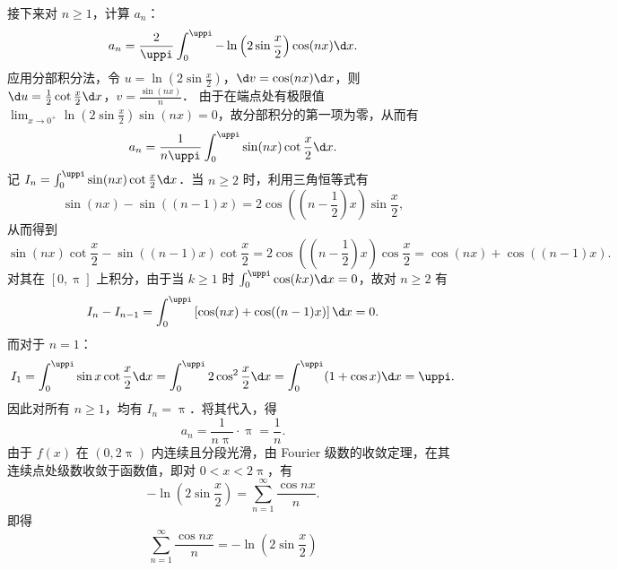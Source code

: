 \begin{myproof}
    接下来对 $n \geqslant 1$，计算 $a_n$：
    \begin{equation}\label{eq:an-integral}
        a_n = \frac{2}{\uppi} \int_{0}^{\uppi} -\ln \left( 2\sin \frac{x}{2} \right) \cos(nx) \d x.
    \end{equation}
    应用分部积分法，令 $u = \ln \left( 2\sin \frac{x}{2} \right)$，$\d v = \cos(nx) \d x$，则 $\d u = \frac{1}{2} \cot \frac{x}{2} \d x$，$v = \frac{\sin(nx)}{n}$．
    由于在端点处有极限值 $\lim_{x \to 0^+} \ln \left( 2\sin \frac{x}{2} \right) \sin(nx) = 0$，故分部积分的第一项为零，从而有
    \begin{equation}\label{eq:an-parts}
        a_n = \frac{1}{n\uppi} \int_{0}^{\uppi} \sin(nx) \cot \frac{x}{2} \d x.
    \end{equation}
    记 $I_n = \int_{0}^{\uppi} \sin(nx) \cot \frac{x}{2} \d x$．当 $n \geqslant 2$ 时，利用三角恒等式有
    \begin{equation}\label{eq:trig-identity}
        \sin(nx) - \sin((n-1)x) = 2 \cos\left( \left(n - \frac{1}{2}\right)x \right) \sin \frac{x}{2},
    \end{equation}
    从而得到
    \begin{equation}\label{eq:diff-identity}
        \sin(nx) \cot \frac{x}{2} - \sin((n-1)x) \cot \frac{x}{2} = 2 \cos\left( \left(n - \frac{1}{2}\right)x \right) \cos \frac{x}{2} = \cos(nx) + \cos((n-1)x).
    \end{equation}
    对其在 $[0, \uppi]$ 上积分，由于当 $k \geqslant 1$ 时 $\int_{0}^{\uppi} \cos(kx) \d x = 0$，故对 $n \geqslant 2$ 有
    \begin{equation}\label{eq:in-diff}
        I_n - I_{n-1} = \int_{0}^{\uppi} \left[ \cos(nx) + \cos((n-1)x) \right] \d x = 0.
    \end{equation}
    而对于 $n=1$：
    \begin{equation}\label{eq:i1-calc}
        I_1 = \int_{0}^{\uppi} \sin x \cot \frac{x}{2} \d x = \int_{0}^{\uppi} 2 \cos^2 \frac{x}{2} \d x = \int_{0}^{\uppi} (1 + \cos x) \d x = \uppi.
    \end{equation}
    因此对所有 $n \geqslant 1$，均有 $I_n = \uppi$．将其代入，得
    \begin{equation}\label{eq:an-final}
        a_n = \frac{1}{n\uppi} \cdot \uppi = \frac{1}{n}.
    \end{equation}
    由于 $f(x)$ 在 $(0, 2\uppi)$ 内连续且分段光滑，由 Fourier 级数的收敛定理，在其连续点处级数收敛于函数值，即对 $0 < x < 2\uppi$，有
    \begin{equation}\label{eq:res-2-mid}
        -\ln \left( 2\sin \frac{x}{2} \right) = \sum_{n=1}^{\infty} \frac{\cos nx}{n}.
    \end{equation}
    即得
    \begin{equation}
        \boxed{\sum_{n=1}^{\infty} \frac{\cos nx}{n} = - \ln \left( 2\sin \frac{x}{2} \right)}
    \end{equation}


\end{myproof}
